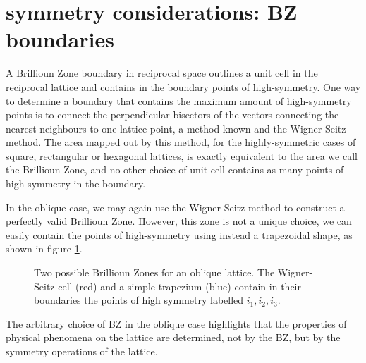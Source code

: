 \documentclass[oneside,11pt,book]{book}
\begin{document}
\section{symmetry considerations: BZ boundaries}
A Brillioun Zone boundary in reciprocal space outlines a unit cell in the reciprocal lattice and contains in the boundary points of high-symmetry. One way to determine a boundary that contains the maximum amount of high-symmetry points is to connect the perpendicular bisectors of the vectors connecting the nearest neighbours to one lattice point, a method known and the Wigner-Seitz method. The area mapped out by this method, for the highly-symmetric cases of square, rectangular or hexagonal lattices, is exactly equivalent to the area we call the Brillioun Zone, and no other choice of unit cell contains as many points of high-symmetry in the boundary.

In the oblique case, we may again use the Wigner-Seitz method to construct a perfectly valid Brillioun Zone. However, this zone is not a unique choice, we can easily contain the points of high-symmetry using instead a trapezoidal shape, as shown in figure \ref{}.

\begin{figure}
\centering 
\caption{Two possible Brillioun Zones for an oblique lattice. The Wigner-Seitz cell (\color{red}red\color{black}) and a simple trapezium (\color{blue}blue\color{black}) contain in their boundaries the points of high symmetry labelled $i_1,i_2,i_3$.}
\end{figure}

The arbitrary choice of BZ in the oblique case highlights that the properties of physical phenomena on the lattice are determined, not by the BZ, but by the symmetry operations of the lattice.
\end{document}
